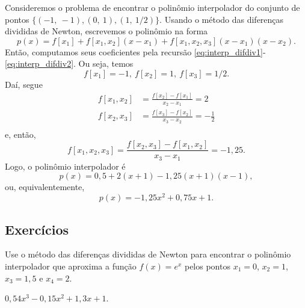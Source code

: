 \begin{ex}
  Consideremos o problema de encontrar o polinômio interpolador do conjunto de pontos $\{(-1,~-1), (0,~1), (1,~1/2)\}$. Usando o método das diferenças divididas de Newton, escrevemos o polinômio na forma
  \begin{equation}
    p(x) = f[x_1] + f[x_1,x_2](x-x_1) + f[x_1,x_2,x_3](x-x_1)(x-x_2).
  \end{equation}
  Então, computamos seus coeficientes pela recursão \eqref{eq:interp_difdiv1}-\eqref{eq:interp_difdiv2}. Ou seja, temos
  \begin{equation}
    f[x_1]=-1,~f[x_2]=1,~f[x_3]=1/2.
  \end{equation}
  Daí, segue
  \begin{align}
    f[x_1,x_2] &= \frac{f[x_2]-f[x_1]}{x_2-x_1} = 2\\
    f[x_2,x_3] &= \frac{f[x_3]-f[x_2]}{x_3-x_2} = -\frac{1}{2}\\
  \end{align}
  e, então,
  \begin{equation}
    f[x_1,x_2,x_3] = \frac{f[x_2,x_3]-f[x_1,x_2]}{x_3-x_1}=-1,25.
  \end{equation}
  Logo, o polinômio interpolador é
  \begin{equation}
    p(x) = 0,5 + 2(x+1) - 1,25(x+1)(x-1),
  \end{equation}
  ou, equivalentemente,
  \begin{equation}
    p(x) = -1,25x^2 + 0,75x + 1.
  \end{equation}

% 
\end{ex}

\subsection*{Exercícios}

\begin{exer}\label{exer_interpoli_difdiv1}
  Use o método das diferenças divididas de Newton para encontrar o polinômio interpolador que aproxima a função $f(x)=e^{x}$ pelos pontos $x_1=0$, $x_2=1$, $x_3=1,5$ e $x_4=2$.
\end{exer}
\begin{resp}
$0,54x^3 - 0,15x^2 + 1,3x + 1$.
\end{resp}

